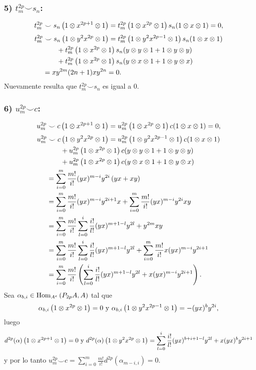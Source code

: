 \documentclass[fleqn,../tesis.tex]{subfiles}
\begin{document}
\subsubsection{5) $t_m^{2p} \smile s_n$:}
\begin{align*}
	t_m^{2p} \smile s_n\left(1 \otimes x^{2 p + 1}\otimes 1\right) = t_m^{2p}\left(1 \otimes x^{2p} \otimes 1\right)
		s_n(1 \otimes x \otimes 1) = 0,
\end{align*}
\begin{align*}
	t_m^{2p} &\smile s_n\left(1 \otimes y^2x^{2 p}\otimes 1\right) =
		t_m^{2p}\left(1 \otimes y^{2}x^{2p - 1}\otimes 1\right)s_n(1 \otimes x \otimes 1)\\
	&\qquad + t_m^{2p}\left(1 \otimes x^{2p} \otimes 1\right)s_n(y \otimes y \otimes 1 + 1 \otimes y \otimes y)\\
	&\qquad + t_m^{2p}\left(1 \otimes x^{2p} \otimes 1\right)s_n(y \otimes x \otimes 1 + 1 \otimes y \otimes x)\\
	&= xy^{2m}(2n + 1)xy^{2n} = 0.
\end{align*}
Nuevamente resulta que $t_m^{2p} \smile s_n$ es igual a $0$.

\subsubsection{6) $u_m^{2p} \smile c$:}
\begin{align*}
	u_{m}^{2p} \smile c \left(1 \otimes x^{2p + 1} \otimes 1\right) = u_{m}^{2p}\left(1\otimes x^{2p} \otimes 1\right)c(1 \otimes x \otimes 1)
	=0,
\end{align*}
\begin{align*}
	u_{m}^{2p} &\smile c \left(1 \otimes y^2x^{2p} \otimes 1 \right) =
		u_m^{2p}\left(1 \otimes y^{2}x^{2p - 1}\otimes 1\right)c(1 \otimes x \otimes 1)\\
	&\qquad + u_m^{2p}\left(1 \otimes x^{2p} \otimes 1\right)c(y \otimes y \otimes 1 + 1 \otimes y \otimes y)\\
	&\qquad + u_m^{2p}\left(1 \otimes x^{2p} \otimes 1\right)c(y \otimes x \otimes 1 + 1 \otimes y \otimes x)\\
	&= \sum_{i = 0}^{m}\frac{m!}{i!}(yx)^{m - i}y^{2i}\left(yx + xy\right)\\
	&= \sum_{i = 0}^{m}\frac{m!}{i!}(yx)^{m - i}y^{2i + 1}x + \sum_{i = 0}^{m}\frac{m!}{i!}(yx)^{m - i}y^{2i}xy\\ 
	&= \sum_{i = 0}^{m}\frac{m!}{i!}\sum_{l = 0}^{i}\frac{i!}{l!}(yx)^{m + 1 - l}y^{2l} + y^{2m}xy\\
	&= \sum_{i = 0}^{m}\frac{m!}{i!}\sum_{l = 0}^{i}\frac{i!}{l!}(yx)^{m + 1 - l}y^{2l}
		+ \sum_{i = 0}^{m}\frac{m!}{i!}x(yx)^{m - i}y^{2i + 1}\\
	&= \sum_{i = 0}^{m}\frac{m!}{i!}\left(\sum_{l = 0}^{i}\frac{i!}{l!}(yx)^{m + 1 - l}y^{2l}
		+ x(yx)^{m - i}y^{2i + 1}\right).
\end{align*}
Sea $\alpha_{b, i} \in \operatorname{Hom}_{A^e}\left(P_{2p}A, A\right)$ tal que
\[
	\alpha_{b, i}\left(1 \otimes x^{2p} \otimes 1\right) = 0 \text{ y }
		\alpha_{b, i}\left(1 \otimes y^2x^{2p - 1}\otimes 1\right) = -(yx)^by^{2i},
\]
luego
\[
	d^{2p}(\alpha)\left(1 \otimes x^{2p + 1} \otimes 1\right) = 0 \text{ y }
d^{2p}(\alpha)\left(1 \otimes y^2x^{2p} \otimes 1\right) = \sum_{l = 0}^{i}\frac{i!}{l!}(yx)^{b + i + 1 - l}y^{2l}
		+ x(yx)^{b}y^{2i + 1}
\]
y por lo tanto $u_{m}^{2p} \smile c = \sum_{i =0}^{m}\frac{m!}{i!}d^{2p}\left(\alpha_{m - i, i}\right) = 0$.
\end{document}
